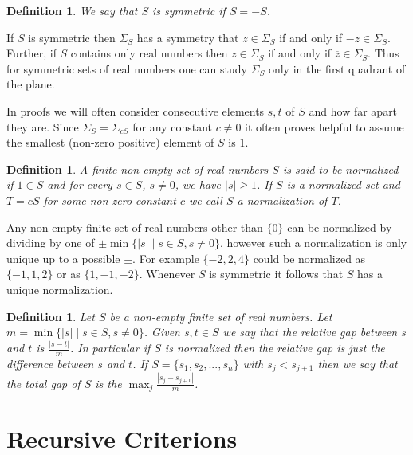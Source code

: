\documentclass[11pt]{amsart}
\newtheorem{definition}[theorem]{Definition}
\numberwithin{theorem}{section} %
\numberwithin{corollary}{section}
\numberwithin{lemma}{section}
\numberwithin{proposition}{section}
\numberwithin{definition}{section}
\begin{document}
\begin{definition}
We say that $S$ is symmetric if $S = -S$.
\end{definition}

If $S$ is symmetric then $\Sigma_S$ has a symmetry that $z \in \Sigma_S$ if and only if $-z \in \Sigma_S$. Further, if $S$ contains only real numbers then $z \in \Sigma_S$ if and only if $\overline{z} \in \Sigma_S$. Thus for symmetric sets of real numbers one can study $\Sigma_S$ only in the first quadrant of the plane.



In proofs we will often consider consecutive elements $s, t$ of $S$ and how far apart they are. Since $\Sigma_S = \Sigma_{cS}$ for any constant $c \neq 0$ it often proves helpful to assume the smallest (non-zero positive) element of $S$ is $1$. 

\begin{definition}
A finite non-empty set of real numbers $S$ is said to be normalized if $1 \in S$ and for every $s \in S$, $s \neq 0$, we have $|s| \geqslant 1$. If $S$ is a normalized set and $T = cS$ for some non-zero constant $c$ we call $S$ a normalization of $T$.
\end{definition}

Any non-empty finite set of real numbers other than $\{ 0 \}$ can be normalized by dividing by one of $\pm \min\{|s| \mid s \in S, s \neq 0 \}$, however such a normalization is only unique up to a possible $\pm$. For example $\{-2, 2, 4 \}$ could be normalized as $\{-1, 1, 2 \}$ or as $\{1, -1, -2 \}$. Whenever $S$ is symmetric it follows that $S$ has a unique normalization. 

\begin{definition}
Let $S$ be a non-empty finite set of real numbers. Let $m = \min \{|s| \mid s \in S, s \neq 0 \}$. Given $s, t \in S$ we say that the relative gap between $s$ and $t$ is $\frac{|s-t|}{m}$. In particular if $S$ is normalized then the relative gap is just the difference between $s$ and $t$. If $S = \{s_1, s_2, ..., s_n \}$ with $s_j < s_{j+1}$ then we say that the total gap of $S$ is the $\max_j \frac{|s_j - s_{j+1}|}{m}$.
\end{definition}














\section{Recursive Criterions}
\end{document}
